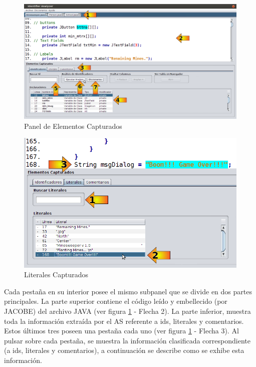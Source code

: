 \begin{figure}[t!] %
\centerline{%
\includegraphics[scale= 0.42]{./cap4/ida_03.png}
}
\caption{Panel de Elementos Capturados}
\label{ida3}
\end{figure}

\begin{figure}[h!] %
\centerline{%
\includegraphics[scale= 0.5]{./cap4/ida_04.png}
}
\caption{Literales Capturados}
\label{ida4}
\end{figure}

Cada pestaña en su interior posee el mismo subpanel que se divide en dos partes principales. La parte superior contiene el código leído y embellecido (por JACOBE) del archivo JAVA (ver figura \ref{ida3} - Flecha 2).
La parte inferior, muestra toda la información extraída por el AS referente a ids, literales y comentarios. Estos últimos tres poseen una pestaña cada uno (ver figura \ref{ida3} - Flecha 3). Al pulsar sobre cada pestaña, se muestra la información clasificada correspondiente (a ids, literales y comentarios), a continuación se describe como se exhibe esta información.


